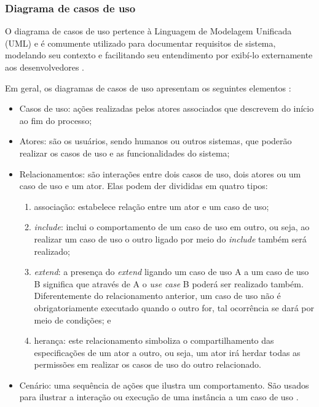 \hspace{2.5cm}
\subsubsection{Diagrama de casos de uso}
\label{subsubsec:casos-uso}
\hspace{2.5cm}

O diagrama de casos de uso pertence à Linguagem de Modelagem Unificada (UML) e é comumente utilizado para documentar requisitos de sistema, modelando seu contexto e facilitando seu entendimento por exibí-lo externamente aos desenvolvedores .

Em geral, os diagramas de casos de uso apresentam os seguintes elementos :

\begin{itemize}
 \item Casos de uso: ações realizadas pelos atores associados que descrevem do início ao fim do processo;
 \item Atores: são os usuários, sendo humanos ou outros sistemas, que poderão realizar os casos de uso e as funcionalidades do sistema;
 \item Relacionamentos: são interações entre dois casos de uso, dois atores ou um caso de uso e um ator. Elas podem der divididas em quatro tipos:
 
 \begin{enumerate}
  \item associação: estabelece relação entre um ator e um caso de uso;
  \item \textit{include}: inclui o comportamento de um caso de uso em outro, ou seja, ao realizar um caso de uso o outro ligado por meio do \textit{include} também será realizado;
  \item \textit{extend}: a presença do \textit{extend} ligando um caso de uso A a um caso de uso B significa que através de A o \textit{use case} B poderá ser realizado também. Diferentemente do relacionamento anterior, um caso de uso não é obrigatoriamente executado quando o outro for, tal ocorrência se dará por meio de condições; e
  \item herança: este relacionamento simboliza o compartilhamento das especificações de um ator a outro, ou seja, um ator irá herdar todas as permissões em realizar os casos de uso do outro relacionado.
 \end{enumerate}
 
\item Cenário: uma sequência de ações que ilustra um comportamento. São usados para ilustrar a interação ou execução de uma instância a um caso de uso \cite[~p. 239, tradução nossa]{zapata2007conversion}. 

\end{itemize}

